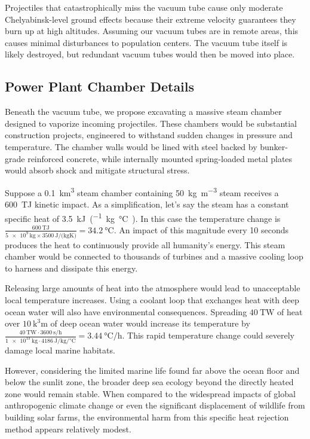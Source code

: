 \documentclass{article}
\begin{document}
Projectiles that catastrophically miss the vacuum tube cause only moderate Chelyabinsk-level \cite{popova2021chelyabinsk} ground effects because their extreme velocity guarantees they burn up at high altitudes.   Assuming our vacuum tubes are in remote areas, this causes minimal disturbances to population centers.   The vacuum tube itself is likely destroyed, but redundant vacuum tubes would then be moved into place.

\subsection{Power Plant Chamber Details}
Beneath the vacuum tube, we propose excavating a massive steam chamber designed to vaporize incoming projectiles. These chambers would be substantial construction projects, engineered to withstand sudden changes in pressure and temperature.  The chamber walls would be lined  with steel backed by bunker-grade reinforced concrete, while internally mounted spring-loaded metal plates would absorb shock and mitigate structural stress.  

Suppose a \SI{0.1}{\cubic\kilo\meter} steam chamber containing \SI{50}{\kilo\gram\per\cubic\meter} steam receives a \SI{600}{\tera\joule} kinetic impact.   As a simplification, let's say the steam has a constant specific heat of \SI{3.5}{\kilo\joule\per(\kilo\gram\celsius)}.  In this case the temperature change is 
$\frac{\SI{600}{\tera\joule}}{\SI{5e9}{\kilo\gram}\times\SI{3500}{\joule\per(\kilo\gram\kelvin)}} = \SI{34.2}{\celsius}$.  An impact of this magnitude every 10 seconds produces the heat to continuously provide all humanity's energy.  This steam chamber would be connected to thousands of turbines and a massive cooling loop to harness and dissipate this energy.  

Releasing large amounts of heat into the atmosphere would lead to unacceptable local temperature increases. Using a coolant loop that exchanges heat with deep ocean water will also have environmental consequences. Spreading $\SI{40}{\tera\watt}$ of heat over $\SI{10}{\cubic\kilo\meter}$ of deep ocean water would increase its temperature by $\frac{\SI{40}{\tera\watt}\cdot\SI{3600}{\second\per\hour}}{\SI{1e13}{\kilo\gram}\cdot\SI{4186}{\joule\per\kilo\gram\per\celsius}} = \SI{3.44}{\celsius\per\hour}$.  This rapid temperature change could severely damage local marine habitats.

However, considering the limited marine life found far above the ocean floor and below the sunlit zone, the broader deep sea ecology beyond the directly heated zone would remain stable. When compared to the widespread impacts of global anthropogenic climate change or even the significant displacement of wildlife from building solar farms, the environmental harm from this specific heat rejection method appears relatively modest.
\end{document}
